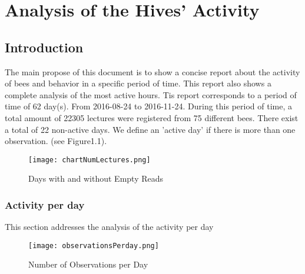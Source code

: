 \documentclass[11pt,fleqn]{book} %
\begin{document}

\pagestyle{empty} %

\tableofcontents %


\pagestyle{fancy} %


\chapter{Analysis of the Hives' Activity}

\normalsize%
\section*{Introduction}%
The main propose of this document  is to show a concise report about the activity of bees and behavior in a specific period of time. This report also shows a complete analysis of the most active hours.\newline%
\newline%
Tis report corresponds to a period of time of 62 day(s). From 2016{-}08{-}24 to 2016{-}11{-}24. During this period of time, a total amount of 22305 lectures were registered from 75 different bees. There exist a total of 22 non{-}active days. We define an 'active day' if there is more than one observation. (see Figure1.1).\newline%
\newline%
%


\begin{figure}[h!]%
\centering%
\texttt{[image: chartNumLectures.png]}%
\caption{Days with and without Empty Reads}%
\end{figure}

%
\subsection*{Activity per day}%
This section addresses the analysis of the activity per day%


\begin{figure}[h!]%
\centering%
\texttt{[image: observationsPerday.png]}%
\caption{Number of Observations per Day}%
\end{figure}
\end{document}
